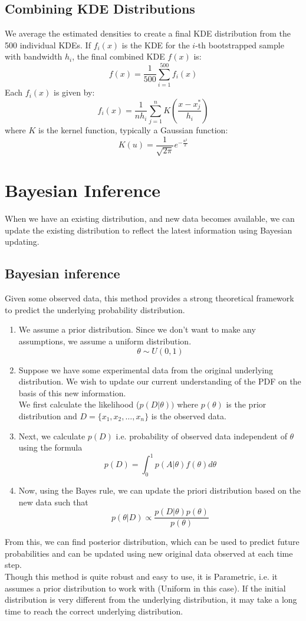 \documentclass[conference]{IEEEtran}
\begin{document}
\subsection{Combining KDE Distributions}
We average the estimated densities to create a final KDE distribution from the 500 individual KDEs. If \( f_i(x) \) is the KDE for the \( i \)-th bootstrapped sample with bandwidth \( h_i \), the final combined KDE \( f(x) \) is:
\[
f(x) = \frac{1}{500} \sum_{i=1}^{500} f_i(x)
\]
Each \( f_i(x) \) is given by:
\[
f_i(x) = \frac{1}{n h_i} \sum_{j=1}^{n} K \left( \frac{x - x_j^*}{h_i} \right)
\]
where \( K \) is the kernel function, typically a Gaussian function:
\[
K(u) = \frac{1}{\sqrt{2\pi}} e^{-\frac{u^2}{2}}
\]

\section{Bayesian Inference}
When we have an existing distribution, and new data becomes available, we can update the existing distribution to reflect the latest information using Bayesian updating. 
\subsection{Bayesian inference}
Given some observed data, this method provides a strong theoretical framework to predict the underlying probability distribution.\\
\begin{enumerate}
\item We assume a prior distribution. Since we don't want to make any assumptions, we assume a uniform distribution. 
\[
\theta \sim U(0,1)
\]
\item Suppose we have some experimental data from the original underlying distribution. We wish to update our current understanding of the PDF on the basis of this new information. \\
We first calculate the likelihood (\( p(D | \theta)) \) where \( p(\theta) \) is the prior distribution and \( D = \{x_1, x_2, \ldots, x_n\} \) is the observed data.\\
\item Next, we calculate \( p(D) \) i.e. probability of observed data independent of \(\theta\) using the formula \[
p(D) = \int_{0}^{1} p(A | \theta) f(\theta) d\theta
\]

\item Now, using the Bayes rule, we can update the priori distribution based on the new data such that
\[
p(\theta | D) \propto \frac{p(D | \theta) p(\theta)}{p(\theta)}
\]
\end{enumerate}
From this, we can find posterior distribution, which can be used to predict future probabilities and can be updated using new original data observed at each time step.\\
Though this method is quite robust and easy to use, it is Parametric, i.e. it assumes a prior distribution to work with (Uniform in this case). If the initial distribution is very different from the underlying distribution, it may take a long time to reach the correct underlying distribution.
\end{document}
